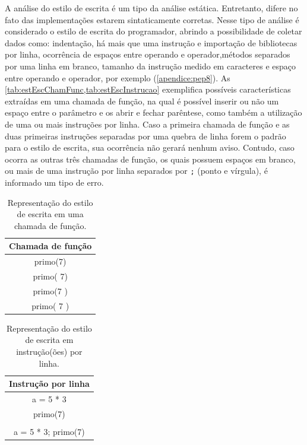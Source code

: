 			A análise do estilo de escrita é um tipo da análise estática. Entretanto,
			difere no fato das implementações estarem sintaticamente corretas. Nesse
			tipo de análise é considerado o estilo de escrita do programador, abrindo a
			possibilidade de coletar dados como: indentação, há mais que uma instrução e importação
			de bibliotecas por linha, ocorrência de espaços entre operando e operador,métodos
			separados por uma linha em branco, tamanho da instrução  medido em
			caracteres e espaço entre operando e operador, por exemplo (\cref{apendice:pep8}).
			As \cref{tab:estEscChamFunc,tab:estEscInstrucao} exemplifica possíveis características
			extraídas em uma chamada de função, na qual é possível inserir ou não um
			espaço entre o parâmetro e os  abrir e fechar parêntese,
			como também a utilização de uma ou mais instruções por linha. Caso a primeira
			chamada de função e as duas primeiras instruções separadas por uma quebra de linha
			forem o padrão para o estilo de escrita, sua ocorrência não gerará nenhum
			aviso. Contudo, caso ocorra as outras três chamadas de função, os quais
			possuem espaços em branco, ou mais de uma instrução por linha separados
			por \texttt{;} (ponto e vírgula), é informado um tipo de erro.
			
			\begin{table}
				\centering
				\begin{tabular}{|c|}
					\hline
					Chamada de função\\ \hline
					primo(7)\\
					primo( 7)\\
					primo(7 )\\
					primo( 7 )\\
					\hline
				\end{tabular}
				\caption[Representação do estilo de escrita]{Representação do estilo
				de escrita em uma chamada de função.}
				\label{tab:estEscChamFunc}
			\end{table}
			
			\begin{table}
				\centering
				\begin{tabular}{|c|}
					\hline
					Instrução por linha \\ \hline
					a = 5 * 3  \\
					primo(7)	 \\
					\\
					a = 5 * 3; primo(7)	\\
					\hline
				\end{tabular}
				\caption{Representação do estilo de escrita em instrução(ões) por linha.}
				\label{tab:estEscInstrucao}
			\end{table}
			
